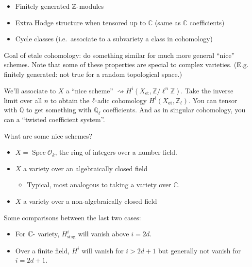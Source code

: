 \begin{itemize}
\tightlist
\item
  Finitely generated \({\mathbb{Z}}{\hbox{-}}\)modules
\item
  Extra Hodge structure when tensored up to \({\mathbb{C}}\) (same as
  \({\mathbb{C}}\) coefficients)
\item
  Cycle classes (i.e.~associate to a subvariety a class in cohomology)
\end{itemize}

Goal of etale cohomology: do something similar for much more general
``nice'' schemes. Note that some of these properties are special to
complex varieties. (E.g. finitely generated: not true for a random
topological space.)

We'll associate to \(X\) a ``nice scheme''
\(\rightsquigarrow H^i(X_{\text{et}}, {\mathbb{Z}}/\ell^n{\mathbb{Z}})\).
Take the inverse limit over all \(n\) to obtain the
\(\ell{\hbox{-}}\)adic cohomology
\(H^i(X_{\text{et}}, {\mathbb{Z}}_\ell)\). You can tensor with
\({\mathbb{Q}}\) to get something with \({\mathbb{Q}}_\ell\)
coefficients. And as in singular cohomology, you can a ``twisted
coefficient system''.

\begin{example}[?]

What are some nice schemes?

\begin{itemize}
\tightlist
\item
  \(X = \operatorname{Spec}{\mathcal{O}}_k\), the ring of integers over
  a number field.
\item
  \(X\) a variety over an algebraically closed field

  \begin{itemize}
  \tightlist
  \item
    Typical, most analogous to taking a variety over \({\mathbb{C}}\).
  \end{itemize}
\item
  \(X\) a variety over a non-algebraically closed field
\end{itemize}

\end{example}

Some comparisons between the last two cases:

\begin{itemize}
\tightlist
\item
  For \({\mathbb{C}}{\hbox{-}}\) variety, \(H^i_{\text{sing}}\) will
  vanish above \(i=2d\).
\item
  Over a finite field, \(H^i\) will vanish for \(i>2d+1\) but generally
  not vanish for \(i=2d+1\).
\end{itemize}

